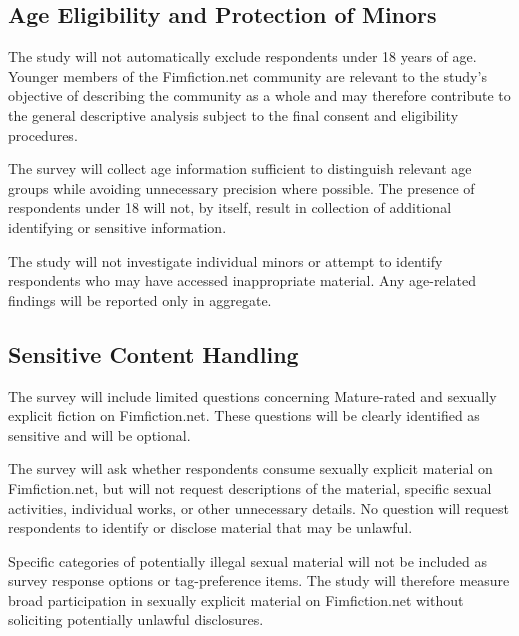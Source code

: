 \subsection{Age Eligibility and Protection of Minors}


The study will not automatically exclude respondents under 18 years of age. Younger members of the Fimfiction.net community are relevant to the study's objective of describing the community as a whole and may therefore contribute to the general descriptive analysis subject to the final consent and eligibility procedures.

The survey will collect age information sufficient to distinguish relevant age groups while avoiding unnecessary precision where possible. The presence of respondents under 18 will not, by itself, result in collection of additional identifying or sensitive information.

The study will not investigate individual minors or attempt to identify respondents who may have accessed inappropriate material. Any age-related findings will be reported only in aggregate.


\subsection{Sensitive Content Handling}

The survey will include limited questions concerning Mature-rated and sexually explicit fiction on Fimfiction.net. These questions will be clearly identified as sensitive and will be optional.

The survey will ask whether respondents consume sexually explicit material on Fimfiction.net, but will not request descriptions of the material, specific sexual activities, individual works, or other unnecessary details. No question will request respondents to identify or disclose material that may be unlawful.

Specific categories of potentially illegal sexual material will not be included as survey response options or tag-preference items. The study will therefore measure broad participation in sexually explicit material on Fimfiction.net without soliciting potentially unlawful disclosures.

